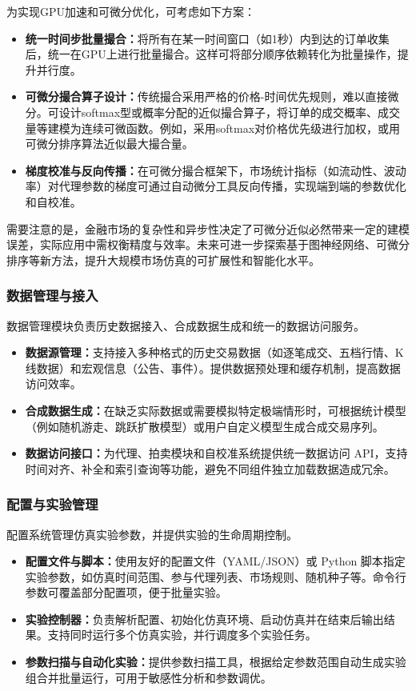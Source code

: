 为实现GPU加速和可微分优化，可考虑如下方案：
\begin{itemize}
  \item \textbf{统一时间步批量撮合：}将所有在某一时间窗口（如1秒）内到达的订单收集后，统一在GPU上进行批量撮合。这样可将部分顺序依赖转化为批量操作，提升并行度。
  \item \textbf{可微分撮合算子设计：}传统撮合采用严格的价格-时间优先规则，难以直接微分。可设计softmax型或概率分配的近似撮合算子，将订单的成交概率、成交量等建模为连续可微函数。例如，采用softmax对价格优先级进行加权，或用可微分排序算法近似最大撮合量。
  \item \textbf{梯度校准与反向传播：}在可微分撮合框架下，市场统计指标（如流动性、波动率）对代理参数的梯度可通过自动微分工具反向传播，实现端到端的参数优化和自校准。
\end{itemize}
需要注意的是，金融市场的复杂性和异步性决定了可微分近似必然带来一定的建模误差，实际应用中需权衡精度与效率。未来可进一步探索基于图神经网络、可微分排序等新方法，提升大规模市场仿真的可扩展性和智能化水平。


\subsubsection{数据管理与接入}

数据管理模块负责历史数据接入、合成数据生成和统一的数据访问服务。

\begin{itemize}
  \item \textbf{数据源管理：}支持接入多种格式的历史交易数据（如逐笔成交、五档行情、K 线数据）和宏观信息（公告、事件）。提供数据预处理和缓存机制，提高数据访问效率。
  \item \textbf{合成数据生成：}在缺乏实际数据或需要模拟特定极端情形时，可根据统计模型（例如随机游走、跳跃扩散模型）或用户自定义模型生成合成交易序列。
  \item \textbf{数据访问接口：}为代理、拍卖模块和自校准系统提供统一数据访问 API，支持时间对齐、补全和索引查询等功能，避免不同组件独立加载数据造成冗余。
\end{itemize}

\subsubsection{配置与实验管理}

配置系统管理仿真实验参数，并提供实验的生命周期控制。

\begin{itemize}
  \item \textbf{配置文件与脚本：}使用友好的配置文件（YAML/JSON）或 Python 脚本指定实验参数，如仿真时间范围、参与代理列表、市场规则、随机种子等。命令行参数可覆盖部分配置项，便于批量实验。
  \item \textbf{实验控制器：}负责解析配置、初始化仿真环境、启动仿真并在结束后输出结果。支持同时运行多个仿真实验，并行调度多个实验任务。
  \item \textbf{参数扫描与自动化实验：}提供参数扫描工具，根据给定参数范围自动生成实验组合并批量运行，可用于敏感性分析和参数调优。
\end{itemize}

